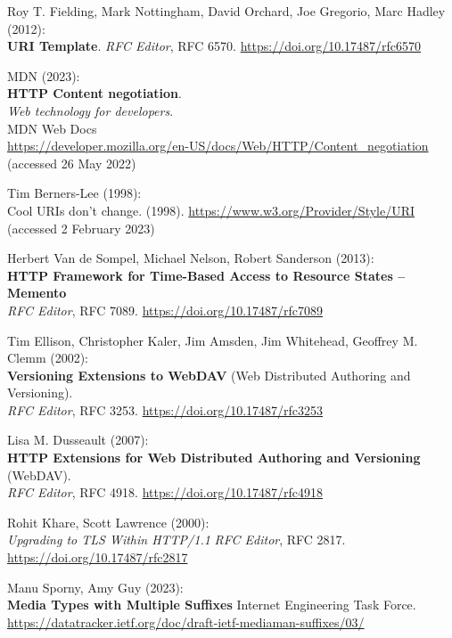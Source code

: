 \begin{thebibliography}{9}
Roy T. Fielding, Mark Nottingham, David Orchard, Joe Gregorio, Marc
Hadley (2012): \\
\textbf{{URI Template}}.
\emph{RFC Editor}, RFC 6570.
\url{https://doi.org/10.17487/rfc6570}

MDN (2023): \\
\textbf{HTTP Content negotiation}.\\
\emph{Web technology for developers}. \\
MDN Web Docs \\
\url{https://developer.mozilla.org/en-US/docs/Web/HTTP/Content_negotiation}
(accessed 26 May 2022)

Tim Berners-Lee (1998): \\
Cool {URIs} don't change. (1998).
\url{https://www.w3.org/Provider/Style/URI} (accessed 2 February 2023)

Herbert Van de Sompel, Michael Nelson, Robert Sanderson (2013):\\
\textbf{{HTTP Framework} for {Time-Based Access} to {Resource States} --
{Memento}}\\
\emph{RFC Editor}, RFC 7089.
\url{https://doi.org/10.17487/rfc7089}

Tim Ellison, Christopher Kaler, Jim Amsden, Jim Whitehead, Geoffrey
M. Clemm (2002): \\
\textbf{Versioning Extensions to WebDAV} (Web Distributed Authoring and Versioning).\\
\emph{RFC Editor}, RFC 3253.
\url{https://doi.org/10.17487/rfc3253}

Lisa M. Dusseault (2007): \\
\textbf{HTTP Extensions for Web Distributed Authoring and Versioning} (WebDAV). \\
\emph{RFC Editor}, RFC 4918.
\url{https://doi.org/10.17487/rfc4918}

Rohit Khare, Scott Lawrence (2000): \\
\emph{Upgrading to {TLS Within HTTP}/1.1}
\emph{RFC Editor}, RFC 2817.
\url{https://doi.org/10.17487/rfc2817}

Manu Sporny, Amy Guy (2023): \\
\textbf{{Media Types with Multiple Suffixes}} 
Internet Engineering Task Force.
\url{https://datatracker.ietf.org/doc/draft-ietf-mediaman-suffixes/03/}


\end{thebibliography}
